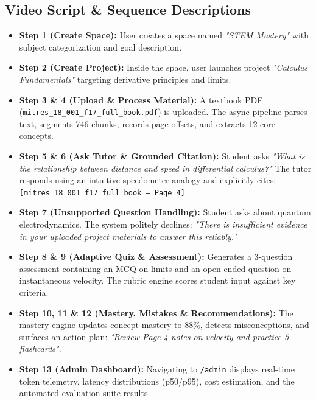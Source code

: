 \documentclass[11pt,a4paper]{article}
\begin{document}
\subsection{Video Script \& Sequence Descriptions}
\begin{itemize}[leftmargin=*,noitemsep]
    \item \textbf{Step 1 (Create Space):} User creates a space named \textit{"STEM Mastery"} with subject categorization and goal description.
    \item \textbf{Step 2 (Create Project):} Inside the space, user launches project \textit{"Calculus Fundamentals"} targeting derivative principles and limits.
    \item \textbf{Step 3 \& 4 (Upload \& Process Material):} A textbook PDF (\texttt{mitres\_18\_001\_f17\_full\_book.pdf}) is uploaded. The async pipeline parses text, segments 746 chunks, records page offsets, and extracts 12 core concepts.
    \item \textbf{Step 5 \& 6 (Ask Tutor \& Grounded Citation):} Student asks \textit{"What is the relationship between distance and speed in differential calculus?"} The tutor responds using an intuitive speedometer analogy and explicitly cites: \texttt{[mitres\_18\_001\_f17\_full\_book — Page 4]}.
    \item \textbf{Step 7 (Unsupported Question Handling):} Student asks about quantum electrodynamics. The system politely declines: \textit{"There is insufficient evidence in your uploaded project materials to answer this reliably."}
    \item \textbf{Step 8 \& 9 (Adaptive Quiz \& Assessment):} Generates a 3-question assessment containing an MCQ on limits and an open-ended question on instantaneous velocity. The rubric engine scores student input against key criteria.
    \item \textbf{Step 10, 11 \& 12 (Mastery, Mistakes \& Recommendations):} The mastery engine updates concept mastery to 88\%, detects misconceptions, and surfaces an action plan: \textit{"Review Page 4 notes on velocity and practice 5 flashcards"}.
    \item \textbf{Step 13 (Admin Dashboard):} Navigating to \texttt{/admin} displays real-time token telemetry, latency distributions (p50/p95), cost estimation, and the automated evaluation suite results.
\end{itemize}

\end{document}
